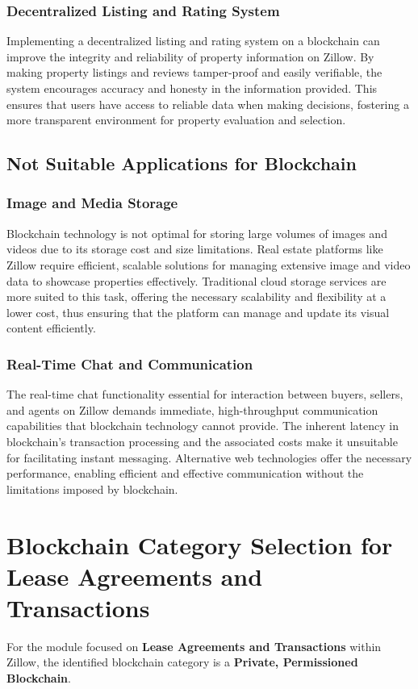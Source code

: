 \documentclass{article}
\begin{document}
\subsubsection{Decentralized Listing and Rating System}
Implementing a decentralized listing and rating system on a blockchain can improve the integrity and reliability of property information on Zillow. By making property listings and reviews tamper-proof and easily verifiable, the system encourages accuracy and honesty in the information provided. This ensures that users have access to reliable data when making decisions, fostering a more transparent environment for property evaluation and selection.

\subsection{Not Suitable Applications for Blockchain}

\subsubsection{Image and Media Storage}
Blockchain technology is not optimal for storing large volumes of images and videos due to its storage cost and size limitations. Real estate platforms like Zillow require efficient, scalable solutions for managing extensive image and video data to showcase properties effectively. Traditional cloud storage services are more suited to this task, offering the necessary scalability and flexibility at a lower cost, thus ensuring that the platform can manage and update its visual content efficiently.

\subsubsection{Real-Time Chat and Communication}
The real-time chat functionality essential for interaction between buyers, sellers, and agents on Zillow demands immediate, high-throughput communication capabilities that blockchain technology cannot provide. The inherent latency in blockchain's transaction processing and the associated costs make it unsuitable for facilitating instant messaging. Alternative web technologies offer the necessary performance, enabling efficient and effective communication without the limitations imposed by blockchain.

\section{Blockchain Category Selection for Lease Agreements and Transactions}
For the module focused on \textbf{Lease Agreements and Transactions} within Zillow, the identified blockchain category is a \textbf{Private, Permissioned Blockchain}.
\end{document}
